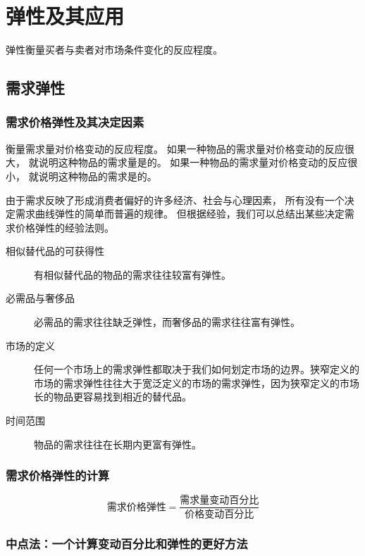 
\chapter{弹性及其应用}

弹性衡量买者与卖者对市场条件变化的反应程度。

\section{需求弹性}

\subsection{需求价格弹性及其决定因素}

衡量需求量对价格变动的反应程度。
如果一种物品的需求量对价格变动的反应很大，
就说明这种物品的需求量是的。
如果一种物品的需求量对价格变动的反应很小，
就说明这种物品的需求是的。


由于需求反映了形成消费者偏好的许多经济、社会与心理因素，
所有没有一个决定需求曲线弹性的简单而普遍的规律。
但根据经验，我们可以总结出某些决定需求价格弹性的经验法则。

\begin{description}
\item[相似替代品的可获得性] 有相似替代品的物品的需求往往较富有弹性。
\item[必需品与奢侈品] 必需品的需求往往缺乏弹性，而奢侈品的需求往往富有弹性。
\item[市场的定义] 任何一个市场上的需求弹性都取决于我们如何划定市场的边界。狭窄定义的市场的需求弹性往往大于宽泛定义的市场的需求弹性，因为狭窄定义的市场长的物品更容易找到相近的替代品。
\item[时间范围] 物品的需求往往在长期内更富有弹性。
\end{description}



\subsection{需求价格弹性的计算}

\begin{equation}
  \text{需求价格弹性} = \frac{\text{需求量变动百分比}}{\text{价格变动百分比}}
\end{equation}



\subsection{中点法：一个计算变动百分比和弹性的更好方法}

